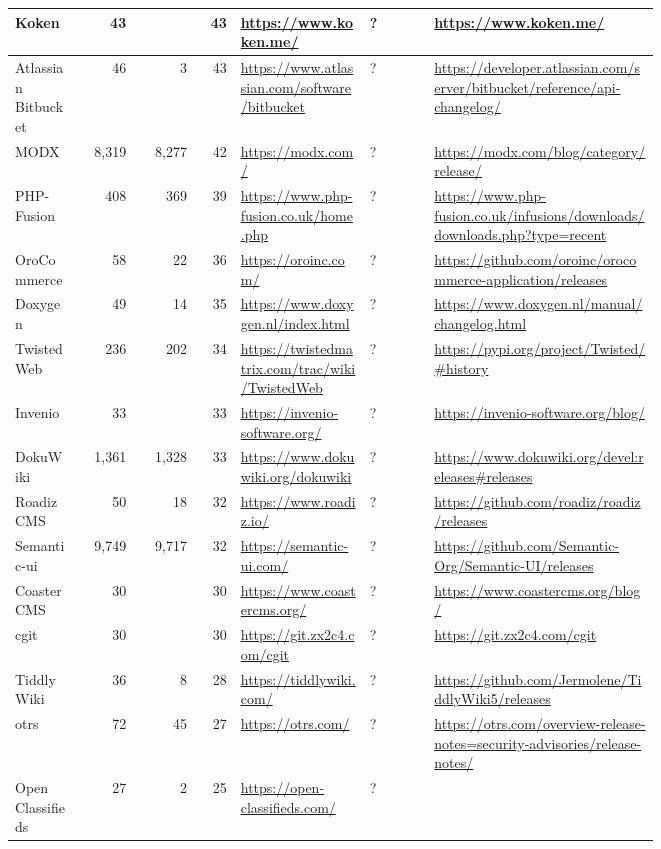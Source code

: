 \begin{landscape}
\begin{longtable}{|p{0.1\linewidth}|r|r|r|p{0.2\linewidth}|p{0.1\linewidth}|p{0.35\linewidth}|}
		Koken &43 & &43 &\url{https://www.koken.me/} &? &\url{https://www.koken.me/} \\\hline
		Atlassian Bitbucket &46 &3 &43 &\url{https://www.atlassian.com/software/bitbucket} &? &\url{https://developer.atlassian.com/server/bitbucket/reference/api-changelog/} \\\hline
		MODX &8,319 &8,277 &42 &\url{https://modx.com/} &? &\url{https://modx.com/blog/category/release/} \\\hline
		PHP-Fusion &408 &369 &39 &\url{https://www.php-fusion.co.uk/home.php} &? &\url{https://www.php-fusion.co.uk/infusions/downloads/downloads.php?type=recent} \\\hline
		OroCommerce &58 &22 &36 &\url{https://oroinc.com/} &? &\url{https://github.com/oroinc/orocommerce-application/releases} \\\hline
		Doxygen &49 &14 &35 &\url{https://www.doxygen.nl/index.html} &? &\url{https://www.doxygen.nl/manual/changelog.html} \\\hline
		TwistedWeb &236 &202 &34 &\url{https://twistedmatrix.com/trac/wiki/TwistedWeb} &? &\url{https://pypi.org/project/Twisted/\#history} \\\hline
		Invenio &33 & &33 &\url{https://invenio-software.org/} &? &\url{https://invenio-software.org/blog/} \\\hline
		DokuWiki &1,361 &1,328 &33 &\url{https://www.dokuwiki.org/dokuwiki} &? &\url{https://www.dokuwiki.org/devel:releases\#releases} \\\hline
		Roadiz CMS &50 &18 &32 &\url{https://www.roadiz.io/} &? &\url{https://github.com/roadiz/roadiz/releases} \\\hline
		Semantic-ui &9,749 &9,717 &32 &\url{https://semantic-ui.com/} &? &\url{https://github.com/Semantic-Org/Semantic-UI/releases} \\\hline
		Coaster CMS &30 & &30 &\url{https://www.coastercms.org/} &? &\url{https://www.coastercms.org/blog/} \\\hline
		cgit &30 & &30 &\url{https://git.zx2c4.com/cgit} &? &\url{https://git.zx2c4.com/cgit} \\\hline
		TiddlyWiki &36 &8 &28 &\url{https://tiddlywiki.com/} &? &\url{https://github.com/Jermolene/TiddlyWiki5/releases} \\\hline
		otrs &72 &45 &27 &\url{https://otrs.com/} &? &\url{https://otrs.com/overview-release-notes=security-advisories/release-notes/} \\\hline
		Open Classifieds &27 &2 &25 &\url{https://open-classifieds.com/} &? & \\\hline

\end{longtable}
\end{landscape}
